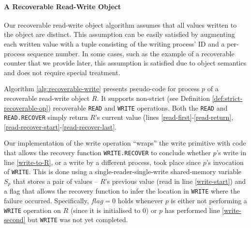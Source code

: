 \paragraph*{A Recoverable Read-Write Object}

Our recoverable read-write object algorithm assumes that all values written to the object are distinct. This assumption can be easily satisfied by augmenting each written value with a tuple consisting of the writing process' ID and a per-process sequence number. In some cases, such as the example of a recoverable counter that we provide later, this assumption is satisfied due to object semantics and does not require special treatment.

Algorithm \ref{alg:recoverable-write} presents pseudo-code for process $p$ of a recoverable read-write object $R$. It supports non-strict (see Definition \ref{def:strict-recoverable-op}) recoverable \texttt{READ} and \texttt{WRITE} operations. Both the \texttt{READ} and \texttt{READ.RECOVER} simply return $R$'s current value (lines \ref{read-first}-\ref{read-return}, \ref{read-recover-start}-\ref{read-recover-last}.

Our implementation of the write operation ``wraps'' the write primitive with code that allows the recovery function \texttt{WRITE.RECOVER} to conclude whether $p$'s write in line \ref{write-to-R}, or a write by a different process, took place since $p$'s invocation of \texttt{WRITE}. This is done using a single-reader-single-write shared-memory variable $S_p$ that stores a pair of values -- $R$'s previous value (read in line \ref{write-start}) and a flag that allows the recovery function  to infer the location in \texttt{WRITE} where the failure occurred. Specifically, $flag=0$ holds whenever $p$ is either not performing a \texttt{WRITE} operation on $R$ (since it is initialised to $0$) or $p$ has performed line \ref{write-second} but \texttt{WRITE} was not yet completed.

